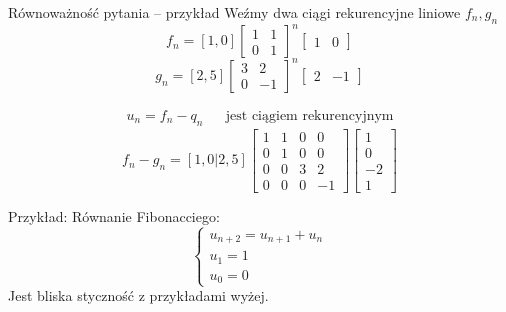 \documentclass[handout]{beamer}
\theoremstyle{definition}
\theoremstyle{named}
\begin{document}
\begin{frame}{Równoważność pytania -- przykład}
Weźmy dwa ciągi rekurencyjne liniowe $f_n, g_n$
    \begin{equation*}
        f_{n} = [1,0] \begin{bmatrix}
            1 & 1 \\
            0 & 1 
        \end{bmatrix}^{n}
        \begin{bmatrix}
            1 & 0
        \end{bmatrix}
    \end{equation*}
    \begin{equation*}
         g_{n} = [2,5] \begin{bmatrix}
            3 & 2 \\
            0 & -1 
        \end{bmatrix}^{n}
        \begin{bmatrix}
            2 & -1
        \end{bmatrix}
    \end{equation*}
    
    \begin{align*}
        u_n = f_n - q_n && \text{jest ciągiem rekurencyjnym} 
    \end{align*}
    $$
        f_n - g_n = [1,0|2,5] 
        \left[
        \begin{array}{cc|cc}
        1 & 1 & 0 & 0 \\
        0 & 1 & 0 & 0 \\
        \hline
        0 & 0 & 3 & 2 \\
        0 & 0 & 0 & -1
        \end{array}
        \right]
        \begin{bmatrix}
            1  \\
            0  \\
            \hline
            -2 \\
            1 
        \end{bmatrix}
    $$
    
\end{frame}


\begin{frame}
    Przykład:
    Równanie Fibonacciego:
   \begin{equation*}
        \begin{cases}
        u_{n+2} = u_{n+1} + u_n \\
        u_{1} = 1 \\
        u_{0} = 0
        \end{cases}
    \end{equation*}
    Jest bliska styczność z przykładami wyżej. 

\end{frame}
\end{document}
